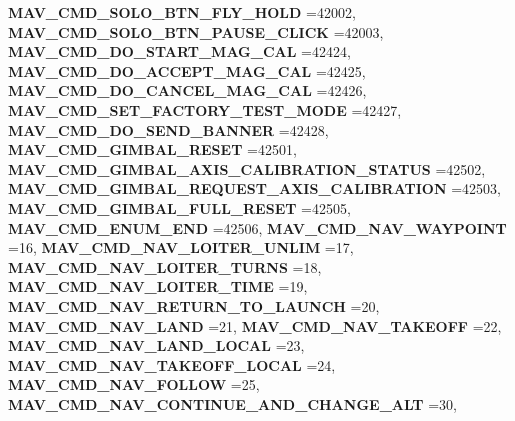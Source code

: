 \begin{DoxyCompactItemize}
\textbf{ M\+A\+V\+\_\+\+C\+M\+D\+\_\+\+S\+O\+L\+O\+\_\+\+B\+T\+N\+\_\+\+F\+L\+Y\+\_\+\+H\+O\+LD} =42002, 
\textbf{ M\+A\+V\+\_\+\+C\+M\+D\+\_\+\+S\+O\+L\+O\+\_\+\+B\+T\+N\+\_\+\+P\+A\+U\+S\+E\+\_\+\+C\+L\+I\+CK} =42003, 
\newline
\textbf{ M\+A\+V\+\_\+\+C\+M\+D\+\_\+\+D\+O\+\_\+\+S\+T\+A\+R\+T\+\_\+\+M\+A\+G\+\_\+\+C\+AL} =42424, 
\textbf{ M\+A\+V\+\_\+\+C\+M\+D\+\_\+\+D\+O\+\_\+\+A\+C\+C\+E\+P\+T\+\_\+\+M\+A\+G\+\_\+\+C\+AL} =42425, 
\textbf{ M\+A\+V\+\_\+\+C\+M\+D\+\_\+\+D\+O\+\_\+\+C\+A\+N\+C\+E\+L\+\_\+\+M\+A\+G\+\_\+\+C\+AL} =42426, 
\textbf{ M\+A\+V\+\_\+\+C\+M\+D\+\_\+\+S\+E\+T\+\_\+\+F\+A\+C\+T\+O\+R\+Y\+\_\+\+T\+E\+S\+T\+\_\+\+M\+O\+DE} =42427, 
\newline
\textbf{ M\+A\+V\+\_\+\+C\+M\+D\+\_\+\+D\+O\+\_\+\+S\+E\+N\+D\+\_\+\+B\+A\+N\+N\+ER} =42428, 
\textbf{ M\+A\+V\+\_\+\+C\+M\+D\+\_\+\+G\+I\+M\+B\+A\+L\+\_\+\+R\+E\+S\+ET} =42501, 
\textbf{ M\+A\+V\+\_\+\+C\+M\+D\+\_\+\+G\+I\+M\+B\+A\+L\+\_\+\+A\+X\+I\+S\+\_\+\+C\+A\+L\+I\+B\+R\+A\+T\+I\+O\+N\+\_\+\+S\+T\+A\+T\+US} =42502, 
\textbf{ M\+A\+V\+\_\+\+C\+M\+D\+\_\+\+G\+I\+M\+B\+A\+L\+\_\+\+R\+E\+Q\+U\+E\+S\+T\+\_\+\+A\+X\+I\+S\+\_\+\+C\+A\+L\+I\+B\+R\+A\+T\+I\+ON} =42503, 
\newline
\textbf{ M\+A\+V\+\_\+\+C\+M\+D\+\_\+\+G\+I\+M\+B\+A\+L\+\_\+\+F\+U\+L\+L\+\_\+\+R\+E\+S\+ET} =42505, 
\textbf{ M\+A\+V\+\_\+\+C\+M\+D\+\_\+\+E\+N\+U\+M\+\_\+\+E\+ND} =42506, 
\textbf{ M\+A\+V\+\_\+\+C\+M\+D\+\_\+\+N\+A\+V\+\_\+\+W\+A\+Y\+P\+O\+I\+NT} =16, 
\textbf{ M\+A\+V\+\_\+\+C\+M\+D\+\_\+\+N\+A\+V\+\_\+\+L\+O\+I\+T\+E\+R\+\_\+\+U\+N\+L\+IM} =17, 
\newline
\textbf{ M\+A\+V\+\_\+\+C\+M\+D\+\_\+\+N\+A\+V\+\_\+\+L\+O\+I\+T\+E\+R\+\_\+\+T\+U\+R\+NS} =18, 
\textbf{ M\+A\+V\+\_\+\+C\+M\+D\+\_\+\+N\+A\+V\+\_\+\+L\+O\+I\+T\+E\+R\+\_\+\+T\+I\+ME} =19, 
\textbf{ M\+A\+V\+\_\+\+C\+M\+D\+\_\+\+N\+A\+V\+\_\+\+R\+E\+T\+U\+R\+N\+\_\+\+T\+O\+\_\+\+L\+A\+U\+N\+CH} =20, 
\textbf{ M\+A\+V\+\_\+\+C\+M\+D\+\_\+\+N\+A\+V\+\_\+\+L\+A\+ND} =21, 
\newline
\textbf{ M\+A\+V\+\_\+\+C\+M\+D\+\_\+\+N\+A\+V\+\_\+\+T\+A\+K\+E\+O\+FF} =22, 
\textbf{ M\+A\+V\+\_\+\+C\+M\+D\+\_\+\+N\+A\+V\+\_\+\+L\+A\+N\+D\+\_\+\+L\+O\+C\+AL} =23, 
\textbf{ M\+A\+V\+\_\+\+C\+M\+D\+\_\+\+N\+A\+V\+\_\+\+T\+A\+K\+E\+O\+F\+F\+\_\+\+L\+O\+C\+AL} =24, 
\textbf{ M\+A\+V\+\_\+\+C\+M\+D\+\_\+\+N\+A\+V\+\_\+\+F\+O\+L\+L\+OW} =25, 
\newline
\textbf{ M\+A\+V\+\_\+\+C\+M\+D\+\_\+\+N\+A\+V\+\_\+\+C\+O\+N\+T\+I\+N\+U\+E\+\_\+\+A\+N\+D\+\_\+\+C\+H\+A\+N\+G\+E\+\_\+\+A\+LT} =30, 

\end{DoxyCompactItemize}
